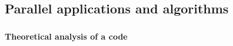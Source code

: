 %





%
%
\subsection{Parallel applications and algorithms}

\begin{frame}[containsverbatim]
\frametitle{}

\begin{center}
\textbf{Theoretical analysis of a code}
\end{center}

\end{frame}



